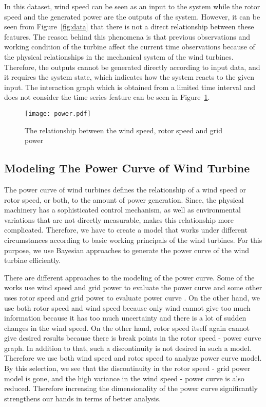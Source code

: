 In this dataset, wind speed can be seen as an input to the system while the rotor speed and the generated power are the outputs of the system. However, it can be seen from Figure~\ref{fig:data} that there is not a direct relationship between these features. The reason behind this phenomena is that previous observations and working condition of the turbine affect the current time observations because of the physical relationships in the mechanical system of the wind turbines. Therefore, the outputs cannot be generated directly according to input data, and it requires the system state, which indicates how the system reacts to the given input. 
The interaction graph which is obtained from a limited time interval and does not consider the time series feature can be seen in Figure~\ref{fig:powercurve}.

\begin{figure}
    \centering
    \texttt{[image: power.pdf]}
    \caption{The relationship between the wind speed, rotor speed and grid power}
    \label{fig:powercurve}
\end{figure}

\subsection{Modeling The Power Curve of Wind Turbine}

The power curve of wind turbines defines the relationship of a wind speed or rotor speed, or both, to the amount of power generation. Since, the physical machinery has a sophisticated control mechanism, as well as environmental variations that are not directly measurable, makes this relationship more complicated. Therefore, we have to create a model that works under different circumstances according to basic working principals of the wind turbines. For this purpose, we use Bayesian approaches to generate the power curve of the wind turbine efficiently.

There are different approaches to the modeling of the power curve. Some of the works use wind speed and grid power to evaluate the power curve \cite{ouyang:17} and some other uses rotor speed and grid power to evaluate power curve \cite{romero:16}. On the other hand, we use both rotor speed and wind speed because only wind cannot give too much information because it has too much uncertainty and there is a lot of sudden changes in the wind speed. On the other hand, rotor speed itself again cannot give desired results because there is break points in the rotor speed - power curve graph. In addition to that, such a discontinuity is not desired in such a model. Therefore we use both wind speed and rotor speed to analyze power curve model. By this selection, we see that the discontinuity in the rotor speed - grid power model is gone, and the high variance in the wind speed - power curve is also reduced. Therefore increasing the dimensionality of the power curve significantly strengthens our hands in terms of better analysis.

